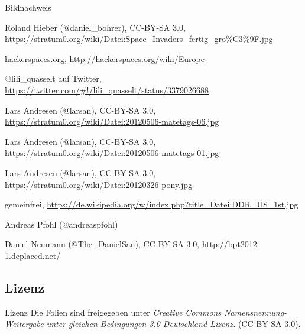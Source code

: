 \documentclass{beamer}
\begin{document}
\begin{frame}{Bildnachweis}
    \footnotesize
    \begin{description}[Folie XX]
        \item[Folie \ref{secinvaders}] Roland Hieber (@daniel\_bohrer), CC-BY-SA 3.0, {\tiny \url{https://stratum0.org/wiki/Datei:Space\_Invaders\_fertig\_gro\%C3\%9F.jpg}}
        \item[Folie \ref{secmap}] hackerspaces.org, {\tiny \url{http://hackerspaces.org/wiki/Europe}}
        \item[Folie \ref{secgeschichte}] @lili\_quasselt auf Twitter,
            {\tiny \url{https://twitter.com/\#!/lili\_quasselt/status/3379026688}}
        \item[Folie \ref{secreprap}] Lars Andresen (@larsan), CC-BY-SA 3.0, {\tiny \url{https://stratum0.org/wiki/Datei:20120506-matetags-06.jpg}}
        \item[Folie \ref{secmatetags}] Lars Andresen (@larsan), CC-BY-SA 3.0, {\tiny \url{https://stratum0.org/wiki/Datei:20120506-matetags-01.jpg}}
        \item[Folie \ref{secpony}] Lars Andresen (@larsan), CC-BY-SA 3.0, {\tiny \url{https://stratum0.org/wiki/Datei:20120326-pony.jpg}}
        \item[Folie \ref{secddr}] gemeinfrei, {\tiny \url{https://de.wikipedia.org/w/index.php?title=Datei:DDR\_US\_1st.jpg}}
        \item[Folie \ref{secgruendung}] Andreas Pfohl (@andreaspfohl)
        \item[Folie \ref{secbaellebad}] Daniel Neumann (@The\_DanielSan), CC-BY-SA 3.0, {\tiny \url{http://bpt2012-1.deplaced.net/}}
    \end{description}
    \normalsize
\end{frame}

\subsection{Lizenz}

\begin{frame}{Lizenz}
    Die Folien sind freigegeben unter \emph{Creative Commons
    Namensnennung-Weitergabe unter gleichen Bedingungen 3.0 Deutschland
    Lizenz.} (CC-BY-SA 3.0).
\end{frame}
\end{document}
